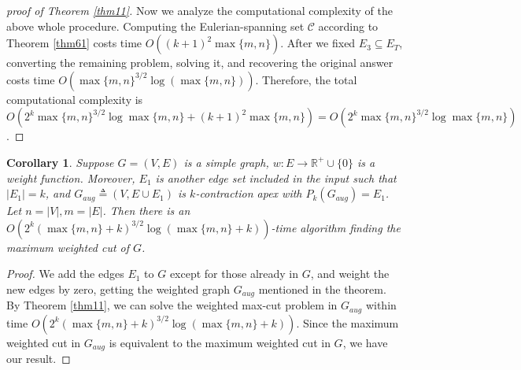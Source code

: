 \documentclass[10pt,fleqn]{article}
\newtheorem{corollary}[theorem]{Corollary}
\newcommand{\R}{\mathbb{R}}
\newcommand{\mc}[1]{\mathcal{#1}}
\begin{document}
\begin{proof}[\it{proof of Theorem \ref{thm11}}]
		Now we analyze the computational complexity of the above whole procedure. Computing the Eulerian-spanning set $\mc{C}$ according to Theorem \ref{thm61} costs time $O((k+1)^2\max\{m,n\})$. After we fixed $E_3\subseteq E_T$, converting the remaining problem, solving it, and recovering the original answer costs time $O(\max\{m,n\}^{3/2}\log(\max\{m,n\}))$. Therefore, the total computational complexity is $O(2^k\max\{m,n\}^{3/2}\log\max\{m,n\}+(k+1)^2\max\{m,n\})=O(2^k\max\{m,n\}^{3/2}\log\max\{m,n\})$.
	\end{proof}
	\begin{corollary}\label{col62}
		Suppose $G=(V,E)$ is a simple graph, $w:E\to \R^+\cup\{0\}$ is a weight function. Moreover, $E_1$ is another edge set included in the input such that $|E_1|=k$, and $G_{aug}\triangleq(V,E\cup E_1)$ is $k$-contraction apex with $P_k(G_{aug})=E_1$. Let $n=|V|,m=|E|$. Then there is an $O(2^k(\max\{m,n\}+k)^{3/2}\log(\max\{m,n\}+k))$-time algorithm finding the maximum weighted cut of $G$.
	\end{corollary} \par
	\begin{proof}
		We add the edges $E_1$ to $G$ except for those already in $G$, and weight the new edges by zero, getting the weighted graph $G_{aug}$ mentioned in the theorem. By Theorem \ref{thm11}, we can solve the weighted max-cut problem in $G_{aug}$ within time $O(2^k(\max\{m,n\}+k)^{3/2}\log(\max\{m,n\}+k))$. Since the maximum weighted cut in $G_{aug}$ is equivalent to the maximum weighted cut in $G$, we have our result.
	\end{proof} \par
	
	
	
\end{document}
